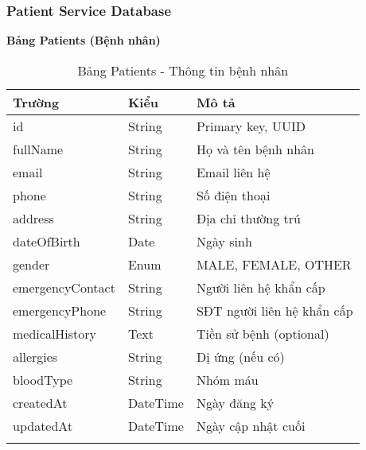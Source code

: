 \documentclass[12pt,a4paper]{report}
\begin{document}
\subsubsection{Patient Service Database}
\textbf{Bảng Patients (Bệnh nhân)}
\begin{longtable}{|p{3cm}|p{2cm}|p{8cm}|}
\hline
\textbf{Trường} & \textbf{Kiểu} & \textbf{Mô tả} \\
\hline
id & String & Primary key, UUID \\
\hline
fullName & String & Họ và tên bệnh nhân \\
\hline
email & String & Email liên hệ \\
\hline
phone & String & Số điện thoại \\
\hline
address & String & Địa chỉ thường trú \\
\hline
dateOfBirth & Date & Ngày sinh \\
\hline
gender & Enum & MALE, FEMALE, OTHER \\
\hline
emergencyContact & String & Người liên hệ khẩn cấp \\
\hline
emergencyPhone & String & SĐT người liên hệ khẩn cấp \\
\hline
medicalHistory & Text & Tiền sử bệnh (optional) \\
\hline
allergies & String & Dị ứng (nếu có) \\
\hline
bloodType & String & Nhóm máu \\
\hline
createdAt & DateTime & Ngày đăng ký \\
\hline
updatedAt & DateTime & Ngày cập nhật cuối \\
\hline
\caption{Bảng Patients - Thông tin bệnh nhân}
\end{longtable}
\end{document}

